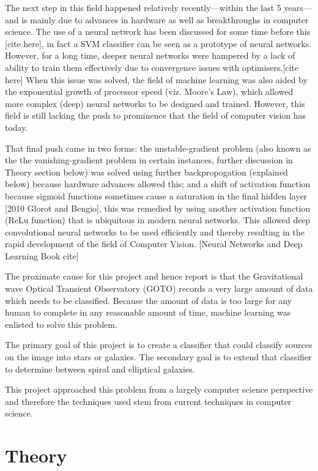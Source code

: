 \documentclass[a4paper,fleqn,usenatbib]{mnras}
\begin{document}
The next step in this field happened relatively recently---within the last 5 years---and is mainly due to advances in hardware as well as breakthroughs in computer science. The use of a neural network has been discussed for some time before this [cite here], in fact a SVM classifier can be seen as a prototype of neural networks. However, for a long time, deeper neural networks were hampered by a lack of ability to train them effectively due to convergence issues with optimisers.[cite here] When this issue was solved, the field of machine learning was also aided by the exponential growth of processor speed (viz. Moore's Law), which allowed more complex (deep) neural networks to be designed and trained. However, this field is still lacking the push to prominence that the field of computer vision has today. 

That final push came in two forms: the unstable-gradient problem (also known as the the vanishing-gradient problem in certain instances, further discussion in Theory section below) was solved using further backpropogation (explained below) because hardware advances allowed this; and a shift of activation function because sigmoid functions sometimes cause a saturation in the final hidden layer [2010 Glorot and Bengio], this was remedied by using another activation function (ReLu function) that is ubiquitous in modern neural networks. This allowed deep convolutional neural networks to be used efficiently and thereby resulting in the rapid development of the field of Computer Vision. [Neural Networks and Deep Learning Book cite]

The proximate cause for this project and hence report is that the Gravitational wave Optical Transient Observatory (GOTO) records a very large amount of data which needs to be classified. Because the amount of data is too large for any human to complete in any reasonable amount of time, machine learning was enlisted to solve this problem. 

The primary goal of this project is to create a classifier that could classify sources on the image into stars or galaxies. The secondary goal is to extend that classifier to determine between spiral and elliptical galaxies. 

This project approached this problem from a largely computer science perspective and therefore the techniques used stem from current techniques in computer science. 

\section{Theory}
\end{document}
